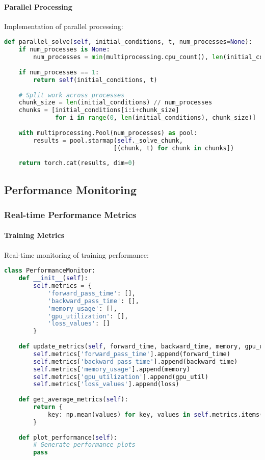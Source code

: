\paragraph{Parallel Processing}
Implementation of parallel processing:

\begin{lstlisting}[language=python, caption=Parallel Processing]
def parallel_solve(self, initial_conditions, t, num_processes=None):
    if num_processes is None:
        num_processes = min(multiprocessing.cpu_count(), len(initial_conditions))
    
    if num_processes == 1:
        return self(initial_conditions, t)
    
    # Split work across processes
    chunk_size = len(initial_conditions) // num_processes
    chunks = [initial_conditions[i:i+chunk_size] 
              for i in range(0, len(initial_conditions), chunk_size)]
    
    with multiprocessing.Pool(num_processes) as pool:
        results = pool.starmap(self._solve_chunk, 
                              [(chunk, t) for chunk in chunks])
    
    return torch.cat(results, dim=0)
\end{lstlisting}

\subsection{Performance Monitoring}

\subsubsection{Real-time Performance Metrics}

\paragraph{Training Metrics}
Real-time monitoring of training performance:

\begin{lstlisting}[language=python, caption=Performance Monitoring]
class PerformanceMonitor:
    def __init__(self):
        self.metrics = {
            'forward_pass_time': [],
            'backward_pass_time': [],
            'memory_usage': [],
            'gpu_utilization': [],
            'loss_values': []
        }
    
    def update_metrics(self, forward_time, backward_time, memory, gpu_util, loss):
        self.metrics['forward_pass_time'].append(forward_time)
        self.metrics['backward_pass_time'].append(backward_time)
        self.metrics['memory_usage'].append(memory)
        self.metrics['gpu_utilization'].append(gpu_util)
        self.metrics['loss_values'].append(loss)
    
    def get_average_metrics(self):
        return {
            key: np.mean(values) for key, values in self.metrics.items()
        }
    
    def plot_performance(self):
        # Generate performance plots
        pass
\end{lstlisting}

